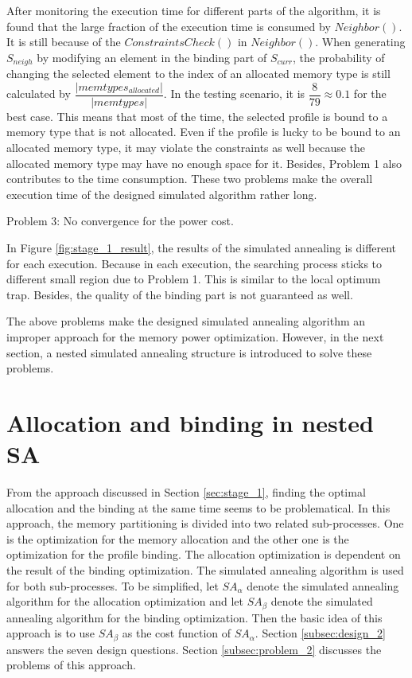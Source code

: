 		After monitoring the execution time for different parts of the algorithm,
		it is found that the large fraction of the execution time is consumed
		by $Neighbor()$. It is still because of the $ConstraintsCheck()$ in $Neighbor()$.
		When generating $S_{neigh}$ by modifying an element in the binding part of
		$S_{curr}$, the probability of changing the selected element to the
		index of an allocated memory type is still calculated by
		$\dfrac{\lvert memtypes_{allocated} \rvert}{\lvert memtypes \rvert}$.
		In the testing scenario, it is $\dfrac{8}{79} \approx 0.1$ for the best case.
		This means that most of the time, the selected profile is bound to a memory
		type that is not allocated. Even if the profile is lucky to be bound to an
		allocated memory type, it may violate the constraints as well because the
		allocated memory type may have no enough space for it.
		Besides, Problem 1 also contributes to the time consumption.
		These two problems make the overall execution time of the designed simulated
		algorithm rather long.
		
		Problem 3: No convergence for the power cost.
		
		In Figure \ref{fig:stage_1_result}, the results of the simulated annealing
		is different for each execution.
		Because in each execution, the searching process sticks to different
		small region due to Problem 1. This is similar to the local optimum trap.
		Besides, the quality of the binding part is not guaranteed as well.
		
		The above problems make the designed simulated annealing algorithm an
		improper approach for the memory power optimization. However, in the next
		section, a nested simulated annealing structure is introduced to solve
		these problems.
		
	\section{Allocation and binding in nested SA}
	\label{sec:stage_2}
	From the approach discussed in Section \ref{sec:stage_1}, finding the optimal
	allocation and the binding at the same time seems to be problematical.
	In this approach, the memory partitioning is divided into two related sub-processes.
	One is the optimization for the memory allocation and the other one is the
	optimization for the profile binding.
	The allocation optimization is dependent on the result of the binding optimization.
	The simulated annealing algorithm is used for both sub-processes.
	To be simplified, let $SA_{\alpha}$ denote the simulated annealing algorithm for the
	allocation optimization and let $SA_{\beta}$ denote the simulated annealing algorithm
	for the binding optimization. Then the basic idea of this approach is to use $SA_{\beta}$
	as the cost function of $SA_{\alpha}$.
	Section \ref{subsec:design_2} answers the seven design questions.
	Section \ref{subsec:problem_2} discusses the problems of this approach.
	
